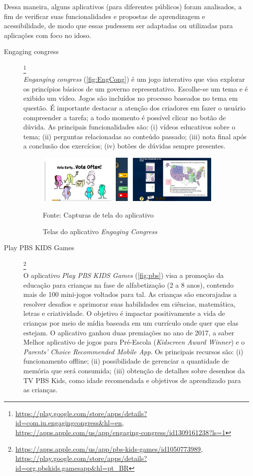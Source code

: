 Dessa maneira, alguns aplicativos (para diferentes públicos) foram analisados, a fim de verificar suas funcionalidades e propostas de aprendizagem e acessibilidade, de modo que essas pudessem ser adaptadas ou utilizadas para aplicações com foco no idoso.

\begin{description}

\item[Engaging congress]\footnote{\url{https://play.google.com/store/apps/details?id=com.iu.engagingcongress&hl=en}, \url{https://apps.apple.com/us/app/engaging-congress/id1309161238?ls=1}} \hfill \\
\textit{Enganging congress} (\autoref{fig:EngCong}) é um jogo interativo que visa explorar os princípios básicos de um governo representativo. Escolhe-se um tema e é exibido um vídeo. Jogos são incluídos no processo baseados no tema em questão. É importante destacar a atenção dos criadores em fazer o usuário compreender a tarefa; a todo momento é possível clicar no botão de dúvida. As principais funcionalidades são: (i) vídeos educativos sobre o tema; (ii) perguntas relacionadas ao conteúdo passado; (iii) nota final após a conclusão dos exercícios; (iv) botões de dúvidas sempre presentes.

\begin{figure}[ht!]
\centering
    \caption{Telas do aplicativo \textit{Engaging Congress}}
    \label{fig:EngCong}
    \includegraphics[width=0.9\textwidth]{Figuras/engagingcongress.png}
    
    Fonte: Capturas de tela do aplicativo
\end{figure}

\item[Play PBS KIDS Games]\footnote{\url{https://apps.apple.com/us/app/pbs-kids-games/id1050773989}, \url{https://play.google.com/store/apps/details?id=org.pbskids.gamesapp&hl=pt_BR}} \hfill \\
O aplicativo \textit{Play PBS KIDS Games} (\autoref{fig:pbs}) visa a promoção da educação para crianças na fase de alfabetização (2 a 8 anos), contendo mais de 100 mini-jogos voltados para tal. As crianças são encorajadas a resolver desafios e aprimorar suas habilidades em ciências, matemática, letras e criatividade. O objetivo é impactar positivamente a vida de crianças por meio de mídia baseada em um currículo onde quer que elas estejam. O aplicativo ganhou duas premiações no ano de 2017, a saber Melhor aplicativo de jogos para Pré-Escola (\textit{Kidscreen Award Winner}) e o \textit{Parents' Choice Recommended Mobile App}. Os principais recursos são: (i) funcionamento offline; (ii) possibilidade de gerenciar a quantidade de memória que será consumida; (iii) obtenção de detalhes sobre desenhos da TV PBS Kids, como idade recomendada e objetivos de aprendizado para as crianças.


\end{description}
